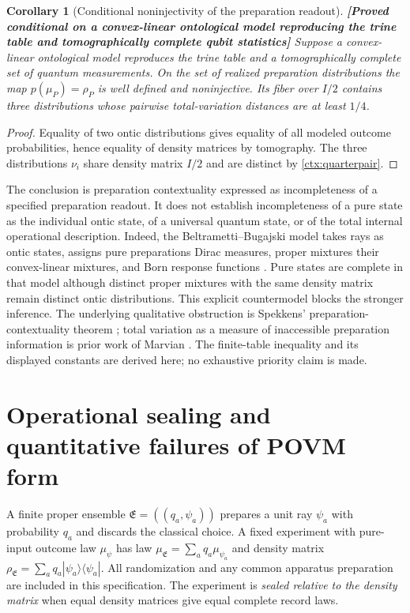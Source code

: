 \documentclass[11pt,a4paper]{article}
\newtheorem{corollary}[theorem]{Corollary}
\theoremstyle{definition}
\theoremstyle{remark}\newtheorem{remark}[theorem]{Remark}
\newcommand{\status}[1]{\textbf{[#1]}\quad}
\begin{document}
\begin{corollary}[Conditional noninjectivity of the preparation readout]
\label{ctx:noninjectivity}
\status{Proved conditional on a convex-linear ontological model reproducing the trine table and tomographically complete qubit statistics}
Suppose a convex-linear ontological model reproduces the trine table and
a tomographically complete set of quantum measurements. On the set of
realized preparation distributions the map $p(\mu_P)=\rho_P$ is well
defined and noninjective. Its fiber over $I/2$ contains three distributions
whose pairwise total-variation distances are at least $1/4$.
\end{corollary}
\begin{proof}
Equality of two ontic distributions gives equality of all modeled outcome
probabilities, hence equality of density matrices by tomography. The
three distributions $\nu_i$ share density matrix $I/2$ and are distinct
by \eqref{ctx:quarterpair}.
\end{proof}

The conclusion is preparation contextuality expressed as incompleteness
of a specified preparation readout. It does not establish incompleteness
of a pure state as the individual ontic state, of a universal quantum
state, or of the total internal operational description. Indeed, the
Beltrametti--Bugajski model takes rays as ontic states, assigns pure
preparations Dirac measures, proper mixtures their convex-linear mixtures,
and Born response functions \cite{BB95}. Pure states are complete in that
model although distinct proper mixtures with the same density matrix
remain distinct ontic distributions. This explicit countermodel blocks
the stronger inference. The underlying qualitative obstruction is
Spekkens' preparation-contextuality theorem \cite{S05}; total variation
as a measure of inaccessible preparation information is prior work of
Marvian \cite{Marvian20}. The finite-table inequality and its displayed
constants are derived here; no exhaustive priority claim is made.

\section{Operational sealing and quantitative failures of POVM form}
\label{ctx:sealingsection}

A finite proper ensemble $\mathfrak E=((q_a,\psi_a))$ prepares a unit ray
$\psi_a$ with probability $q_a$ and discards the classical choice. A fixed
experiment with pure-input outcome law $\mu_\psi$ has law
$\mu_{\mathfrak E}=\sum_aq_a\mu_{\psi_a}$ and density matrix
$\rho_{\mathfrak E}=\sum_aq_a|\psi_a\rangle\langle\psi_a|$.
All randomization and any common apparatus preparation are included in
this specification. The experiment is \emph{sealed relative to the density
matrix} when equal density matrices give equal complete record laws.
\end{document}
